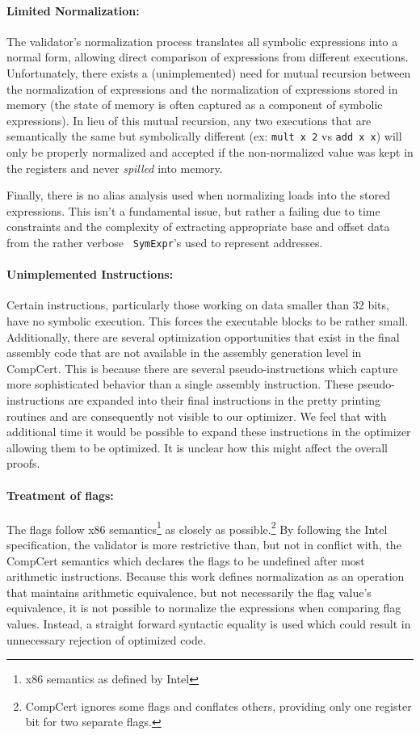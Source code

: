 \documentclass{article}
\begin{document}
\paragraph{Limited Normalization: }The validator's normalization
process translates all symbolic expressions into a normal form,
allowing direct comparison of expressions from different executions.
Unfortunately, there exists a (unimplemented) need for mutual
recursion between the normalization of expressions and the
normalization of expressions stored in memory (the state of memory is
often captured as a component of symbolic expressions).  In lieu of
this mutual recursion, any two executions that are semantically the
same but symbolically different (ex: {\tt mult x 2} vs {\tt add x x})
will only be properly normalized and accepted if the non-normalized
value was kept in the registers and never {\it spilled} into memory.

Finally, there is no alias analysis used when normalizing loads into
the stored expressions.  This isn't a fundamental issue, but rather a
failing due to time constraints and the complexity of extracting
appropriate base and offset data from the rather verbose {\tt
  SymExpr}'s used to represent addresses.

\paragraph{Unimplemented Instructions: }
Certain instructions, particularly those working on data smaller than
32 bits, have no symbolic execution. This forces the executable
blocks to be rather small. Additionally, there are several
optimization opportunities that exist in the final assembly code that
are not available in the assembly generation level in CompCert. This
is because there are several pseudo-instructions which capture more
sophisticated behavior than a single assembly instruction. These
pseudo-instructions are expanded into their final instructions in the
pretty printing routines and are consequently not visible to our
optimizer. We feel that with additional time it would be possible to
expand these instructions in the optimizer allowing them to be
optimized. It is unclear how this might affect the overall proofs.

\paragraph{Treatment of flags: } 
The flags follow x86 semantics\footnote{x86 semantics as defined by
  Intel} as closely as possible.\footnote{CompCert ignores some flags
  and conflates others, providing only one register bit for two
  separate flags.}  By following the Intel specification, the
validator is more restrictive than, but not in conflict with, the
CompCert semantics which declares the flags to be undefined after most
arithmetic instructions.  Because this work defines normalization as
an operation that maintains arithmetic equivalence, but not necessarily
the flag value's equivalence, it is not possible to normalize the
expressions when comparing flag values.  Instead, a straight forward
syntactic equality is used which could result in unnecessary rejection
of optimized code.
\end{document}
